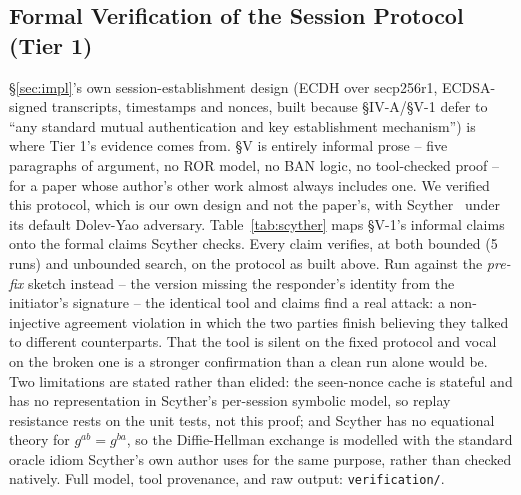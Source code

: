 \documentclass[conference]{IEEEtran}
\begin{document}
\subsection{Formal Verification of the Session Protocol (Tier 1)}
\label{sec:scyther}

\S\ref{sec:impl}'s own session-establishment design (ECDH over secp256r1, ECDSA-signed
transcripts, timestamps and nonces, built because \S IV-A/\S V-1 defer to ``any standard mutual
authentication and key establishment mechanism'') is where Tier 1's evidence comes from.
\S V is entirely informal prose -- five paragraphs of argument, no ROR model, no BAN logic, no
tool-checked proof -- for a paper whose author's other work almost always includes one. We
verified this protocol, which is our own design and not the paper's, with
Scyther~\cite{cremers2008scyther} under its default Dolev-Yao adversary. Table~\ref{tab:scyther}
maps \S V-1's informal claims onto the formal claims Scyther checks. Every claim verifies, at both
bounded (5 runs) and unbounded search, on the protocol as built above. Run against the
\emph{pre-fix} sketch instead -- the version missing the responder's identity from the
initiator's signature -- the identical tool and claims find a real attack: a non-injective
agreement violation in which the two parties finish believing they talked to different
counterparts. That the tool is silent on the fixed protocol and vocal on the broken one is a
stronger confirmation than a clean run alone would be. Two limitations are stated rather than
elided: the seen-nonce cache is stateful and has no representation in Scyther's per-session
symbolic model, so replay resistance rests on the unit tests, not this proof; and Scyther has no
equational theory for $g^{ab} = g^{ba}$, so the Diffie-Hellman exchange is modelled with the
standard oracle idiom Scyther's own author uses for the same purpose, rather than checked
natively. Full model, tool provenance, and raw output: \texttt{verification/}.
\end{document}
